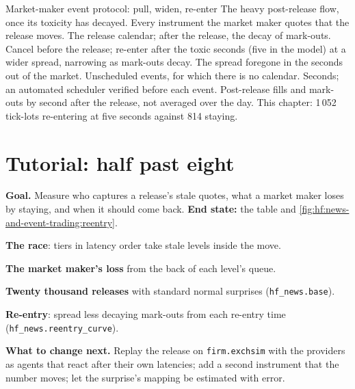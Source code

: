 \begin{strategyfile}{Market-maker event protocol: pull, widen, re-enter}\label{strat:hf:news-and-event-trading:protocol}
 The heavy post-release flow, once its toxicity has decayed.
 Every instrument the market maker quotes that the release moves.
 The release calendar; after the release, the decay of mark-outs.
 Cancel before the release; re-enter after the toxic seconds (five in the model) at a wider spread, narrowing as
mark-outs decay.
 The spread foregone in the seconds out of the market.
 Unscheduled events, for which there is no calendar.
 Seconds; an automated scheduler verified before each event.
 Post-release fills and mark-outs by second after the release, not averaged over the day.
 This chapter: 1\,052 tick-lots re-entering at five seconds against 814 staying.
\end{strategyfile}

\section{Tutorial: half past eight}\label{tut:hf:news-and-event-trading:tut}

\begin{tutorial}
\textbf{Goal.} Measure who captures a release's stale quotes, what a market maker loses by staying, and when it should come back.
\textbf{End state:} the table and \cref{fig:hf:news-and-event-trading:reentry}.
\begin{tutsteps}
\item \textbf{The race}: tiers in latency order take stale levels inside the move.
\label{lst:hf:news-and-event-trading:race}
\item \textbf{The market maker's loss} from the back of each level's queue.
\label{lst:hf:news-and-event-trading:mmloss}
\item \textbf{Twenty thousand releases} with standard normal surprises (\texttt{hf\_news.base}).
\item \textbf{Re-entry}: spread less decaying mark-outs from each re-entry time (\texttt{hf\_news.reentry\_curve}).
\end{tutsteps}
\textbf{What to change next.} Replay the release on \texttt{firm.exchsim} with the providers as agents that react after their own latencies;
add a second instrument that the number moves; let the surprise's mapping be estimated with error.
\end{tutorial}

